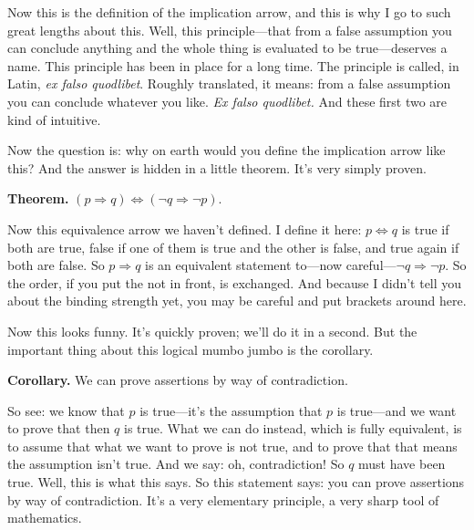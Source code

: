 Now this is the definition of the implication arrow, and this is why I go to such great lengths about this. Well, this principle---that from a false assumption you can conclude anything and the whole thing is evaluated to be true---deserves a name. This principle has been in place for a long time. The principle is called, in Latin, \emph{ex falso quodlibet}. Roughly translated, it means: from a false assumption you can conclude whatever you like. \emph{Ex falso quodlibet.} And these first two are kind of intuitive.

Now the question is: why on earth would you define the implication arrow like this? And the answer is hidden in a little theorem. It's very simply proven.

\textbf{Theorem.} $(p \Rightarrow q) \Leftrightarrow (\lnot q \Rightarrow \lnot p)$.

Now this equivalence arrow we haven't defined. I define it here: $p \Leftrightarrow q$ is true if both are true, false if one of them is true and the other is false, and true again if both are false. So $p \Rightarrow q$ is an equivalent statement to---now careful---$\lnot q \Rightarrow \lnot p$. So the order, if you put the not in front, is exchanged. And because I didn't tell you about the binding strength yet, you may be careful and put brackets around here.

Now this looks funny. It's quickly proven; we'll do it in a second. But the important thing about this logical mumbo jumbo is the corollary.

\textbf{Corollary.} We can prove assertions by way of contradiction.

So see: we know that $p$ is true---it's the assumption that $p$ is true---and we want to prove that then $q$ is true. What we can do instead, which is fully equivalent, is to assume that what we want to prove is not true, and to prove that that means the assumption isn't true. And we say: oh, contradiction! So $q$ must have been true. Well, this is what this says. So this statement says: you can prove assertions by way of contradiction. It's a very elementary principle, a very sharp tool of mathematics.

